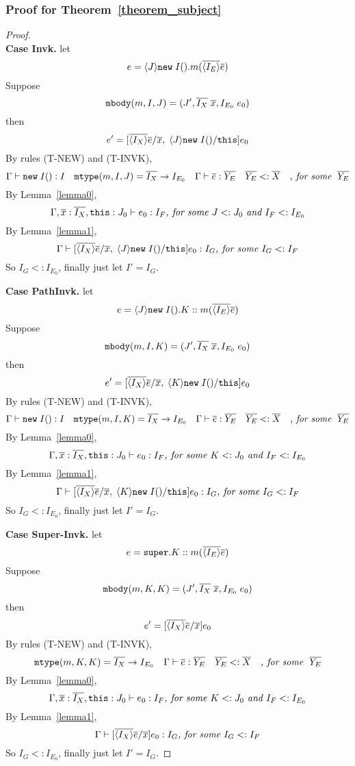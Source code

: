 \subsubsection{Proof for Theorem~\ref{theorem_subject}}
\begin{proof} ~\\
\noindent \textbf{Case Invk.} 
let \[ e = \langle J \rangle\texttt{new} \; I().m(\overline{\langle I_E \rangle}\overline{e}) \] 
Suppose \[ \texttt{mbody}(m, I, J) = (J', \overline{I_X} \; \overline{x}, I_{E_0} \; e_0) \] 
then \[ e' =  [\overline{\langle I_X \rangle} \overline{e}/\overline{x}, \; \langle J \rangle\texttt{new} \; I()/\texttt{this} ] e_0 \] 
By rules (T-NEW) and (T-INVK), 
  \[ \Gamma \; {\vdash} \; \texttt{new} \; I():I \quad 
     \texttt{mtype}(m, I, J) = \overline{I_X} \rightarrow I_{E_0} \quad 
     \Gamma \; {\vdash} \; \overline{e} : \overline{Y_E} \quad
     \overline{Y_E} <: \overline{X} \quad
     \textit{, for some } \; \overline{Y_E}
  \]
By Lemma~\ref{lemma0},
    \[
    \Gamma, \overline{x}:\overline{I_X}, \texttt{this}:J_0 \; {\vdash} \; e_0:I_F \textit{, for some } J <: J_0 \textit{ and } I_F <: I_{E_0}
    \]
By Lemma~\ref{lemma1},
    \[
    \Gamma \; {\vdash} \; [\overline{\langle I_X \rangle} \overline{e}/\overline{x}, \; \langle J \rangle\texttt{new} \; I()/\texttt{this} ] e_0  :  I_G \textit{, for some } I_G <: I_F 
    \]
So $I_G <: I_{E_0}$, finally just let $I' = I_G$.

\noindent \textbf{Case PathInvk.}
let \[ e = \langle J \rangle\texttt{new} \; I().K::m(\overline{\langle I_E \rangle} \overline{e}) \]  
Suppose \[ \texttt{mbody}(m, I, K) = (J', \overline{I_X} \; \overline{x}, I_{E_0} \; e_0) \] 
then \[ e' =  [\overline{\langle I_X \rangle} \overline{e}/\overline{x}, \; \langle K \rangle\texttt{new} \; I()/\texttt{this} ] e_0 \] 
By rules (T-NEW) and (T-INVK), 
  \[ \Gamma \; {\vdash} \; \texttt{new} \; I():I \quad 
     \texttt{mtype}(m, I, K) = \overline{I_X} \rightarrow I_{E_0} \quad 
     \Gamma \; {\vdash} \; \overline{e} : \overline{Y_E} \quad
     \overline{Y_E} <: \overline{X} \quad
     \textit{, for some } \; \overline{Y_E}
  \]
By Lemma~\ref{lemma0},
    \[
    \Gamma, \overline{x}:\overline{I_X}, \texttt{this}:J_0 \; {\vdash} \; e_0:I_F \textit{, for some } K <: J_0 \textit{ and } I_F <: I_{E_0}
    \]
By Lemma~\ref{lemma1},
    \[
    \Gamma \; {\vdash} \; [\overline{\langle I_X \rangle} \overline{e}/\overline{x}, \; \langle K \rangle\texttt{new} \; I()/\texttt{this} ] e_0  :  I_G \textit{, for some } I_G <: I_F 
    \]
So $I_G <: I_{E_0}$, finally just let $I' = I_G$.

\noindent \textbf{Case Super-Invk.}
let \[ e = \texttt{super}.K::m(\overline{\langle I_E \rangle} \overline{e}) \]   
Suppose \[ \texttt{mbody}(m, K, K) = (J', \overline{I_X} \; \overline{x}, I_{E_0} \; e_0) \] 
then \[ e' =  [\overline{\langle I_X \rangle} \overline{e}/\overline{x}] e_0 \] 
By rules (T-NEW) and (T-INVK), 
  \[ 
     \texttt{mtype}(m, K, K) = \overline{I_X} \rightarrow I_{E_0} \quad 
     \Gamma \; {\vdash} \; \overline{e} : \overline{Y_E} \quad
     \overline{Y_E} <: \overline{X} \quad
     \textit{, for some } \; \overline{Y_E}
  \]
By Lemma~\ref{lemma0},
    \[
    \Gamma, \overline{x}:\overline{I_X}, \texttt{this}:J_0 \; {\vdash} \; e_0:I_F \textit{, for some } K <: J_0 \textit{ and } I_F <: I_{E_0}
    \]
By Lemma~\ref{lemma1},
    \[
    \Gamma \; {\vdash} \; [\overline{\langle I_X \rangle} \overline{e}/\overline{x} ] e_0  :  I_G \textit{, for some } I_G <: I_F 
    \]
So $I_G <: I_{E_0}$, finally just let $I' = I_G$.


\end{proof}
